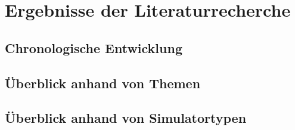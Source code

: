 \chapter{Ergebnisse der Literaturrecherche}

\section{Chronologische Entwicklung}

\section{Überblick anhand von Themen}

\section{Überblick anhand von Simulatortypen}
